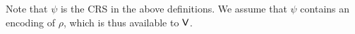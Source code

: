 Note that $\psi$ is the CRS in the above definitions.
We assume that $\psi$ contains an encoding of $\rho$, which is thus available to $\mathsf{V}$.
%
%
